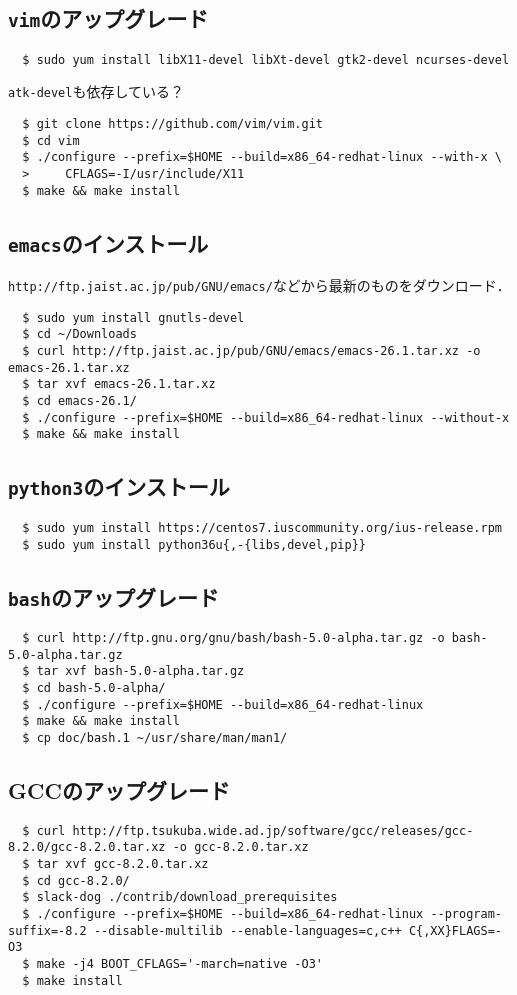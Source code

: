 \documentclass[a4paper]{jsarticle}
\begin{document}
\subsection{\texttt{vim}のアップグレード}
\begin{lstlisting}
  $ sudo yum install libX11-devel libXt-devel gtk2-devel ncurses-devel
\end{lstlisting}
\texttt{atk-devel}も依存している？
\begin{lstlisting}
  $ git clone https://github.com/vim/vim.git
  $ cd vim
  $ ./configure --prefix=$HOME --build=x86_64-redhat-linux --with-x \
  >     CFLAGS=-I/usr/include/X11
  $ make && make install
\end{lstlisting}

\subsection{\texttt{emacs}のインストール}
\texttt{http://ftp.jaist.ac.jp/pub/GNU/emacs/}などから最新のものをダウンロード．
\begin{lstlisting}
  $ sudo yum install gnutls-devel
  $ cd ~/Downloads
  $ curl http://ftp.jaist.ac.jp/pub/GNU/emacs/emacs-26.1.tar.xz -o emacs-26.1.tar.xz
  $ tar xvf emacs-26.1.tar.xz
  $ cd emacs-26.1/
  $ ./configure --prefix=$HOME --build=x86_64-redhat-linux --without-x
  $ make && make install
\end{lstlisting}

\subsection{\texttt{python3}のインストール}
\begin{lstlisting}
  $ sudo yum install https://centos7.iuscommunity.org/ius-release.rpm
  $ sudo yum install python36u{,-{libs,devel,pip}}
\end{lstlisting}

\subsection{\texttt{bash}のアップグレード}
\begin{lstlisting}
  $ curl http://ftp.gnu.org/gnu/bash/bash-5.0-alpha.tar.gz -o bash-5.0-alpha.tar.gz
  $ tar xvf bash-5.0-alpha.tar.gz
  $ cd bash-5.0-alpha/
  $ ./configure --prefix=$HOME --build=x86_64-redhat-linux
  $ make && make install
  $ cp doc/bash.1 ~/usr/share/man/man1/
\end{lstlisting}

\subsection{GCCのアップグレード}
\begin{lstlisting}
  $ curl http://ftp.tsukuba.wide.ad.jp/software/gcc/releases/gcc-8.2.0/gcc-8.2.0.tar.xz -o gcc-8.2.0.tar.xz
  $ tar xvf gcc-8.2.0.tar.xz
  $ cd gcc-8.2.0/
  $ slack-dog ./contrib/download_prerequisites
  $ ./configure --prefix=$HOME --build=x86_64-redhat-linux --program-suffix=-8.2 --disable-multilib --enable-languages=c,c++ C{,XX}FLAGS=-O3
  $ make -j4 BOOT_CFLAGS='-march=native -O3'
  $ make install
\end{lstlisting}
\end{document}
